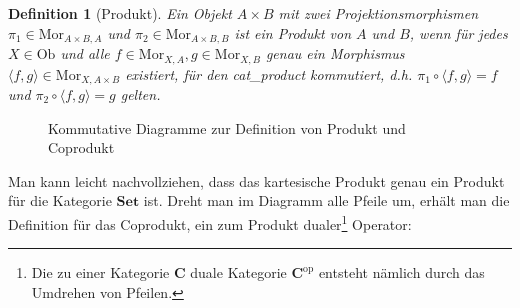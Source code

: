 \documentclass[a4paper, bibgerm]{article}
\newcommand\abb{}
\newtheorem{defi}{Definition}
\begin{document}
\begin{defi}[Produkt]
  Ein Objekt $A \times B$ mit zwei Projektionsmorphismen $\pi_1
  \in \mathrm{Mor}_{A \times B,A}$ und $\pi_2 \in \mathrm{Mor}_{A \times
    B,B}$ ist ein Produkt von $A$ und $B$, wenn für jedes $X \in
  \mathrm{Ob}$ und alle $f \in \mathrm{Mor}_{X,A},g \in
  \mathrm{Mor}_{X,B}$ genau ein Morphismus
  $\langle f,g \rangle \in \mathrm{Mor}_{X,A \times B}$ existiert, für den \abb{cat_product} kommutiert, d.h. 
  $\pi_1 \circ \langle f,g \rangle = f$ und $\pi_2 \circ \langle f,g \rangle = g$ gelten.
\end{defi}

\begin{figure}
  \centering
  \caption{Kommutative Diagramme zur Definition von Produkt und Coprodukt}
\end{figure}

Man kann leicht nachvollziehen, dass das kartesische Produkt genau ein
Produkt für die Kategorie $\mathbf{Set}$ ist. Dreht man im Diagramm alle
Pfeile um, erhält man die Definition für das Coprodukt, ein zum Produkt
dualer\footnote{Die zu einer Kategorie $\mathbf{C}$ duale Kategorie
  $\mathbf{C}^{\mathrm{op}}$ entsteht nämlich durch das Umdrehen von
  Pfeilen.} Operator:
\end{document}
